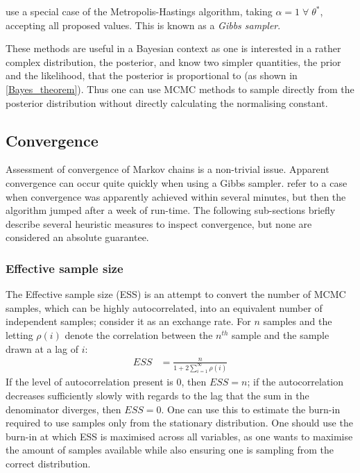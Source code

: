 \documentclass[12pt]{article} %
\begin{document}
\citet{GemanStochasticRelaxationGibbs1984} use a special case of the Metropolis-Hastings algorithm, taking $\alpha = 1 \; \forall \; \theta^*$, accepting all proposed values. This is known as a \emph{Gibbs sampler}.

These methods are useful in a Bayesian context as one is interested in a rather complex distribution, the posterior, and know two simpler quantities, the prior and the likelihood, that the posterior is proportional to (as shown in \eqref{Bayes_theorem}). Thus one can use MCMC methods to sample directly from the posterior distribution without directly calculating the normalising constant.

\subsection{Convergence}
Assessment of convergence of Markov chains is a non-trivial issue. Apparent convergence can occur quite quickly when using a Gibbs sampler. \citet{ripley1990iterative} refer to a case when convergence was apparently achieved within several minutes, but then the algorithm jumped after a week of run-time. The following sub-sections briefly describe several heuristic measures to inspect convergence, but none are considered an absolute guarantee.

\subsubsection{Effective sample size} \label{sec:additional_theory:sub_sec:convergence:sub_sub_sec:ess}
The Effective sample size (ESS) \cite{ripley2009stochastic} is an attempt to convert the number of MCMC samples, which can be highly autocorrelated, into an equivalent number of independent samples; consider it as an exchange rate. For $n$ samples and the letting $\rho(i)$ denote the correlation between the $n^{th}$ sample and the sample drawn at a lag of $i$:
\begin{align} \label{eqn:effective_smaple_size}
ESS &= \frac{n}{1 + 2 \sum_{i=1}^\infty \rho(i)}
\end{align}
If the level of autocorrelation present is 0, then $ESS=n$;  if the autocorrelation decreases sufficiently slowly with regards to the lag that the sum in the denominator diverges, then $ESS=0$. One can use this to estimate the burn-in required to use samples only from the stationary distribution. One should use the burn-in at which ESS is maximised across all variables, as one wants to maximise the amount of samples available  while also ensuring one is sampling from the correct distribution.
\end{document}
